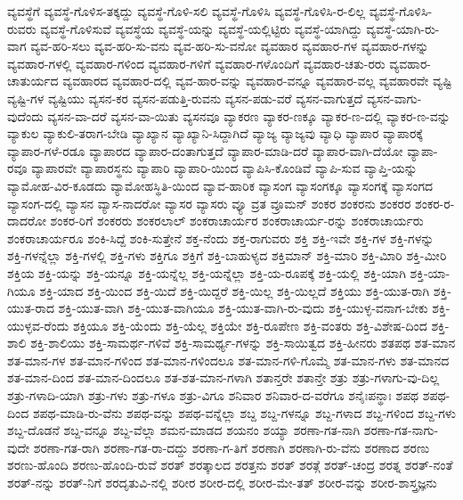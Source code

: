 {ವ್ಯವಸ್ಥೆಗೆ
ವ್ಯವಸ್ಥೆ-ಗೊಳಿಸ-ತಕ್ಕದ್ದು
ವ್ಯವಸ್ಥೆ-ಗೊಳಿ-ಸಲಿ
ವ್ಯವಸ್ಥೆ-ಗೊಳಿಸಿ
ವ್ಯವಸ್ಥೆ-ಗೊಳಿಸಿ-ರ-ಲಿಲ್ಲ
ವ್ಯವಸ್ಥೆ-ಗೊಳಿಸಿ-ರುವರು
ವ್ಯವಸ್ಥೆ-ಗೊಳಿಸುವೆ
ವ್ಯವಸ್ಥೆಯ
ವ್ಯವಸ್ಥೆ-ಯನ್ನು
ವ್ಯವಸ್ಥೆ-ಯಲ್ಲಿಟ್ಟಿರು
ವ್ಯವಸ್ಥೆ-ಯಾಗಿದ್ದು
ವ್ಯವಸ್ಥೆ-ಯಾಗಿ-ರು-ವಾಗ
ವ್ಯವ-ಹರಿ-ಸಲು
ವ್ಯವ-ಹರಿ-ಸು-ವನು
ವ್ಯವ-ಹರಿ-ಸು-ವನೋ
ವ್ಯವಹಾರ
ವ್ಯವಹಾರ-ಗಳ
ವ್ಯವಹಾರ-ಗಳನ್ನು
ವ್ಯವಹಾರ-ಗಳಲ್ಲಿ
ವ್ಯವಹಾರ-ಗಳಿಂದ
ವ್ಯವಹಾರ-ಗಳಿಗೆ
ವ್ಯವಹಾರ-ಗಳೊಂದಿಗೆ
ವ್ಯವಹಾರ-ಚತು-ರರು
ವ್ಯವಹಾರ-ಚಾತುರ್ಯದ
ವ್ಯವಹಾರದ
ವ್ಯವಹಾರ-ದಲ್ಲಿ
ವ್ಯವ-ಹಾರ-ವನ್ನು
ವ್ಯವಹಾರ-ವನ್ನೂ
ವ್ಯವಹಾರ-ವಲ್ಲ
ವ್ಯವಹಾರವೇ
ವ್ಯಷ್ಟಿ
ವ್ಯಷ್ಟಿ-ಗಳ
ವ್ಯಷ್ಟಿಯು
ವ್ಯಸನ-ಕರ
ವ್ಯಸನ-ಪಡುತ್ತಿ-ರುವನು
ವ್ಯಸನ-ಪಡು-ವರೆ
ವ್ಯಸನ-ವಾಗುತ್ತದೆ
ವ್ಯಸನ-ವಾಗು-ವುದೆಂದು
ವ್ಯಸನ-ವಾ-ದರೆ
ವ್ಯಸನ-ವಾ-ಯಿತು
ವ್ಯಸನವೂ
ವ್ಯಾಕರಣ
ವ್ಯಾಕರ-ಣಕ್ಕೂ
ವ್ಯಾಕರ-ಣ-ದಲ್ಲಿ
ವ್ಯಾಕರ-ಣ-ವನ್ನು
ವ್ಯಾಕುಲ
ವ್ಯಾಕುಲಿ-ತರಾಗ-ಬೇಡಿ
ವ್ಯಾಖ್ಯಾನ
ವ್ಯಾಖ್ಯಾನಿ-ಸಿದ್ದಾಗಿದೆ
ವ್ಯಾಜ್ಯ
ವ್ಯಾಜ್ಯವು
ವ್ಯಾಧಿ
ವ್ಯಾಪಾರ
ವ್ಯಾಪಾರಕ್ಕೆ
ವ್ಯಾಪಾರ-ಗಳೆ-ರಡೂ
ವ್ಯಾಪಾರದ
ವ್ಯಾಪಾರ-ದಂತಾಗುತ್ತದೆ
ವ್ಯಾಪಾರ-ಮಾಡಿ-ದರೆ
ವ್ಯಾಪಾರ-ವಾಗಿ-ದೆಯೋ
ವ್ಯಾಪಾ-ರವೂ
ವ್ಯಾಪಾರವೇ
ವ್ಯಾಪಾರಸ್ಥನು
ವ್ಯಾಪಾರಿ
ವ್ಯಾಪಾರಿ-ಯಿಂದ
ವ್ಯಾಪಿಸಿ-ಕೊಂಡಿವೆ
ವ್ಯಾಪಿ-ಸುವ
ವ್ಯಾಪ್ತಿ-ಯನ್ನು
ವ್ಯಾಮೋಹ-ವಿರ-ಕೂಡದು
ವ್ಯಾಮೋಹಸ್ಥಿತಿ-ಯಿಂದ
ವ್ಯಾವ-ಹಾರಿಕ
ವ್ಯಾಸಂಗ
ವ್ಯಾಸಂಗಕ್ಕೂ
ವ್ಯಾಸಂಗಕ್ಕೆ
ವ್ಯಾಸಂಗದ
ವ್ಯಾಸಂಗ-ದಲ್ಲಿ
ವ್ಯಾಸನ
ವ್ಯಾಸ-ನಾದರೋ
ವ್ಯಾಸರ
ವ್ಯಾಸರು
ವ್ಯೂ
ವ್ರತ
ವ್ರೂಮನ್
ಶಂಕರ
ಶಂಕರನು
ಶಂಕರರ
ಶಂಕರ-ರ-ದಾದರೋ
ಶಂಕರ-ರಿಗೆ
ಶಂಕರರು
ಶಂಕರಲಾಲ್
ಶಂಕರಾಚಾರ್ಯರ
ಶಂಕರಾಚಾರ್ಯ-ರನ್ನು
ಶಂಕರಾಚಾರ್ಯರು
ಶಂಕರಾಚಾರ್ಯರೂ
ಶಂಕಿ-ಸಿದ್ದೆ
ಶಂಕಿ-ಸುತ್ತೇನೆ
ಶಕ್ತ-ನೆಂದು
ಶಕ್ತ-ರಾಗುವರು
ಶಕ್ತಿ
ಶಕ್ತಿ-ಇವೇ
ಶಕ್ತಿ-ಗಳ
ಶಕ್ತಿ-ಗಳನ್ನು
ಶಕ್ತಿ-ಗಳನ್ನೆಲ್ಲಾ
ಶಕ್ತಿ-ಗಳಲ್ಲಿ
ಶಕ್ತಿ-ಗಳು
ಶಕ್ತಿಗೂ
ಶಕ್ತಿಗೆ
ಶಕ್ತಿ-ಬಾಹುಳ್ಯದ
ಶಕ್ತಿಮಾನ್
ಶಕ್ತಿ-ಮಾರಿ
ಶಕ್ತಿ-ಮಿಾರಿ
ಶಕ್ತಿ-ಮೀರಿ
ಶಕ್ತಿಯ
ಶಕ್ತಿ-ಯನ್ನು
ಶಕ್ತಿ-ಯನ್ನೂ
ಶಕ್ತಿ-ಯನ್ನೆಲ್ಲ
ಶಕ್ತಿ-ಯನ್ನೆಲ್ಲಾ
ಶಕ್ತಿ-ಯ-ರೂಪಕ್ಕೆ
ಶಕ್ತಿ-ಯಲ್ಲಿ
ಶಕ್ತಿ-ಯಾಗಿ
ಶಕ್ತಿ-ಯಾ-ಗಿಯೂ
ಶಕ್ತಿ-ಯಾದ
ಶಕ್ತಿ-ಯಿಂದ
ಶಕ್ತಿ-ಯಿದೆ
ಶಕ್ತಿ-ಯಿದ್ದರೆ
ಶಕ್ತಿ-ಯಿಲ್ಲ
ಶಕ್ತಿ-ಯಿಲ್ಲದೆ
ಶಕ್ತಿಯು
ಶಕ್ತಿ-ಯುತ-ರಾಗಿ
ಶಕ್ತಿ-ಯುತ-ರಾದ
ಶಕ್ತಿ-ಯುತ-ವಾಗಿ
ಶಕ್ತಿ-ಯುತ-ವಾಗಿಯೂ
ಶಕ್ತಿ-ಯುತ-ವಾಗಿ-ರು-ವುದು
ಶಕ್ತಿ-ಯುಳ್ಳ-ವನಾಗ-ಬೇಕು
ಶಕ್ತಿ-ಯುಳ್ಳವ-ರೆಂದು
ಶಕ್ತಿಯೂ
ಶಕ್ತಿ-ಯೆಂದು
ಶಕ್ತಿ-ಯೆಲ್ಲ
ಶಕ್ತಿಯೇ
ಶಕ್ತಿ-ರೂಪೇಣ
ಶಕ್ತಿ-ವಂತರು
ಶಕ್ತಿ-ವಿಶೇಷ-ದಿಂದ
ಶಕ್ತಿ-ಶಾಲಿ
ಶಕ್ತಿ-ಶಾಲಿಯು
ಶಕ್ತಿ-ಸಾಮರ್ಥ-ಗಳಿವೆ
ಶಕ್ತಿ-ಸಾಮರ್ಥ್ಯ-ಗಳನ್ನು
ಶಕ್ತಿ-ಸಾಯಿತ್ವದ
ಶಕ್ತಿ-ಹೀನರು
ಶತಪಥ
ಶತ-ಮಾನ
ಶತ-ಮಾನ-ಗಳ
ಶತ-ಮಾನ-ಗಳಿಂದ
ಶತ-ಮಾನ-ಗಳಿಂದಲೂ
ಶತ-ಮಾನ-ಗಳಿ-ಗೊಮ್ಮೆ
ಶತ-ಮಾನ-ಗಳು
ಶತ-ಮಾನದ
ಶತ-ಮಾನ-ದಿಂದ
ಶತ-ಮಾನ-ದಿಂದಲೂ
ಶತ-ಶತ-ಮಾನ-ಗಳಾಗಿ
ಶತಾನ್ತರೇ
ಶತಾನ್ತೇ
ಶತ್ರು
ಶತ್ರು-ಗಳಾಗು-ವು-ದಿಲ್ಲ
ಶತ್ರು-ಗಳಾದಿ-ಯಾಗಿ
ಶತ್ರು-ಗಳು
ಶತ್ರು-ಗಳೂ
ಶತ್ರು-ವಿಗೂ
ಶನಿವಾರ
ಶನಿವಾರ-ದ-ವರೆಗೂ
ಶನೈಃಪನ್ಥಾಃ
ಶಪಥ
ಶಪಥ-ದಿಂದ
ಶಪಥ-ಮಾಡಿ-ರು-ವೆನು
ಶಪಥ-ವನ್ನು
ಶಪಥ-ವನ್ನೆಲ್ಲಾ
ಶಬ್ದ
ಶಬ್ದ-ಗಳನ್ನೂ
ಶಬ್ದ-ಗಳಾದ
ಶಬ್ದ-ಗಳಿಂದ
ಶಬ್ದ-ಗಳು
ಶಬ್ದ-ದೊಡನೆ
ಶಬ್ದ-ವನ್ನೂ
ಶಬ್ದ-ವೆಲ್ಲಾ
ಶಮನ-ಮಾಡದ
ಶಯನಂ
ಶಯ್ಯಾ
ಶರಣಾ-ಗತ-ನಾಗಿ
ಶರಣಾ-ಗತ-ನಾಗು-ವುದೇ
ಶರಣಾ-ಗತ-ರಾಗಿ
ಶರಣಾ-ಗತ-ರಾ-ದದ್ದು
ಶರಣಾ-ಗ-ತಿಗೆ
ಶರಣಾಗಿ
ಶರಣಾಗಿ-ರು-ವೆನು
ಶರಣಾದ
ಶರಣು
ಶರಣು-ಹೊಂದಿ
ಶರಣು-ಹೊಂದಿ-ರುವೆ
ಶರತ್
ಶರತ್ಕಾಲದ
ಶರತ್ತನು
ಶರತ್
ಶರತ್ಗೆ
ಶರತ್-ಚಂದ್ರ
ಶರತ್ನ
ಶರತ್-ನಂತೆ
ಶರತ್-ನನ್ನು
ಶರತ್-ನಿಗೆ
ಶರದೃತುವಿ-ನಲ್ಲಿ
ಶರೀರ
ಶರೀರ-ದಲ್ಲಿ
ಶರೀರ-ಮೇ-ತತ್
ಶರೀರ-ವನ್ನು
ಶರೀರ-ಶಾಸ್ತ್ರಜ್ಞನು
}

